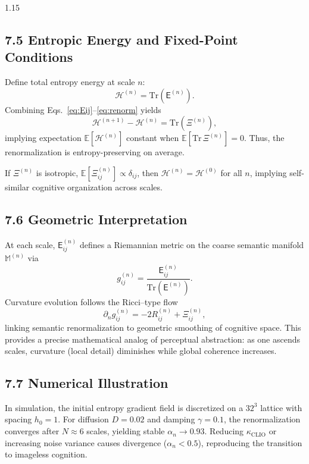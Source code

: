 \documentclass[12pt,a4paper]{article}
\begin{document}
\begin{spacing}{1.15}
\subsection{7.5 Entropic Energy and Fixed-Point Conditions}

Define total entropy energy at scale $n$:
\[
\mathcal{H}^{(n)}=\mathrm{Tr}(\mathsf{E}^{(n)}).
\]
Combining Eqs.~\eqref{eq:Eij}–\eqref{eq:renorm} yields
\[
\mathcal{H}^{(n+1)} - \mathcal{H}^{(n)}
 = \mathrm{Tr}(\Xi^{(n)}),
\]
implying expectation $\mathbb{E}[\mathcal{H}^{(n)}]$ constant when $\mathbb{E}[\mathrm{Tr}\,\Xi^{(n)}]=0$.  
Thus, the renormalization is entropy-preserving on average.

\begin{proposition}
If $\Xi^{(n)}$ is isotropic, $\mathbb{E}[\Xi^{(n)}_{ij}]\propto\delta_{ij}$,  
then $\mathcal{H}^{(n)}=\mathcal{H}^{(0)}$ for all $n$, implying self-similar cognitive organization across scales.
\end{proposition}

\subsection{7.6 Geometric Interpretation}

At each scale, $\mathsf{E}_{ij}^{(n)}$ defines a Riemannian metric on the coarse semantic manifold $\mathbb{M}^{(n)}$ via
\[
g_{ij}^{(n)}=\frac{\mathsf{E}_{ij}^{(n)}}{\mathrm{Tr}(\mathsf{E}^{(n)})}.
\]
Curvature evolution follows the Ricci–type flow
\[
\partial_n g_{ij}^{(n)}=-2R_{ij}^{(n)}+\Xi_{ij}^{(n)},
\]
linking semantic renormalization to geometric smoothing of cognitive space.  
This provides a precise mathematical analog of perceptual abstraction: as one ascends scales, curvature (local detail) diminishes while global coherence increases.

\subsection{7.7 Numerical Illustration}

In simulation, the initial entropy gradient field is discretized on a $32^3$ lattice with spacing $h_0=1$.  
For diffusion $D=0.02$ and damping $\gamma=0.1$, the renormalization converges after $N\!\approx\!6$ scales, yielding stable $\alpha_n\!\to\!0.93$.  
Reducing $\kappa_{\mathrm{CLIO}}$ or increasing noise variance causes divergence ($\alpha_n\!<\!0.5$), reproducing the transition to imageless cognition.


\end{spacing}
\end{document}
